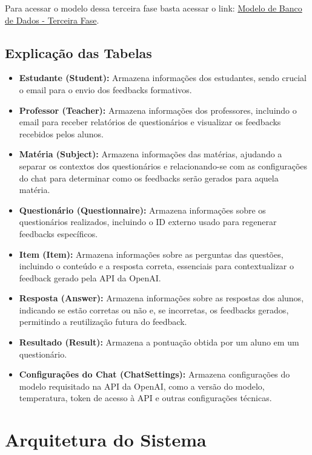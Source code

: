 Para acessar o modelo dessa terceira fase basta acessar o link: \href{https://lucid.app/lucidchart/c1e592ab-3b4a-4bba-9849-cc3237f4fa76/edit?viewport_loc=-2447%2C-1073%2C2164%2C956%2C0_0&invitationId=inv_fbaaf515-3973-4d6a-9359-eb0dc4a26eee}{Modelo de Banco de Dados - Terceira Fase}.

\subsection{Explicação das Tabelas}

\begin{itemize}
    \item \textbf{Estudante (Student):} Armazena informações dos estudantes, sendo crucial o email para o envio dos feedbacks formativos.
    \item \textbf{Professor (Teacher):} Armazena informações dos professores, incluindo o email para receber relatórios de questionários e visualizar os feedbacks recebidos pelos alunos.
    \item \textbf{Matéria (Subject):} Armazena informações das matérias, ajudando a separar os contextos dos questionários e relacionando-se com as configurações do chat para determinar como os feedbacks serão gerados para aquela matéria.
    \item \textbf{Questionário (Questionnaire):} Armazena informações sobre os questionários realizados, incluindo o ID externo usado para regenerar feedbacks específicos.
    \item \textbf{Item (Item):} Armazena informações sobre as perguntas das questões, incluindo o conteúdo e a resposta correta, essenciais para contextualizar o feedback gerado pela API da OpenAI.
    \item \textbf{Resposta (Answer):} Armazena informações sobre as respostas dos alunos, indicando se estão corretas ou não e, se incorretas, os feedbacks gerados, permitindo a reutilização futura do feedback.
    \item \textbf{Resultado (Result):} Armazena a pontuação obtida por um aluno em um questionário.
    \item \textbf{Configurações do Chat (ChatSettings):} Armazena configurações do modelo requisitado na API da OpenAI, como a versão do modelo, temperatura, token de acesso à API e outras configurações técnicas.
\end{itemize}

\section{Arquitetura do Sistema}

